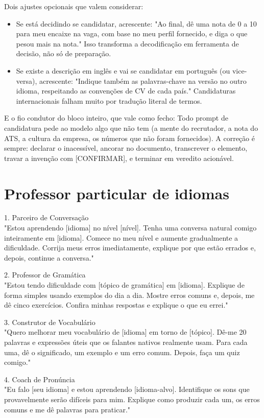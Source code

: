 \documentclass[11pt, a4paper]{article}
\begin{document}
Dois ajustes opcionais que valem considerar:
\begin{itemize}
	\item Se está decidindo se candidatar, acrescente: "Ao final, dê uma nota de 0 a 10 para meu encaixe na vaga, com base no meu perfil fornecido, e diga o que pesou mais na nota." Isso transforma a decodificação em ferramenta de decisão, não só de preparação.
	\item Se existe a descrição em inglês e vai se candidatar em português (ou vice-versa), acrescente: "Indique também as palavras-chave na versão no outro idioma, respeitando as convenções de CV de cada país." Candidaturas internacionais falham muito por tradução literal de termos.
\end{itemize}

E o fio condutor do bloco inteiro, que vale como fecho: Todo prompt de candidatura pede ao modelo algo que não tem (a mente do recrutador, a nota do ATS, a cultura da empresa, os números que não foram fornecidos). A correção é sempre: declarar o inacessível, ancorar no documento, transcrever o elemento, travar a invenção com [CONFIRMAR], e terminar em veredito acionável.

\section*{Professor particular de idiomas}
1. Parceiro de Conversação \\
"Estou aprendendo [idioma] no nível [nível]. Tenha uma conversa natural comigo inteiramente em [idioma]. Comece no meu nível e aumente gradualmente a dificuldade. Corrija meus erros imediatamente, explique por que estão errados e, depois, continue a conversa."

2. Professor de Gramática \\
"Estou tendo dificuldade com [tópico de gramática] em [idioma]. Explique de forma simples usando exemplos do dia a dia. Mostre erros comuns e, depois, me dê cinco exercícios. Confira minhas respostas e explique o que eu errei."

3. Construtor de Vocabulário \\
"Quero melhorar meu vocabulário de [idioma] em torno de [tópico]. Dê-me 20 palavras e expressões úteis que os falantes nativos realmente usam. Para cada uma, dê o significado, um exemplo e um erro comum. Depois, faça um quiz comigo."

4. Coach de Pronúncia \\
"Eu falo [seu idioma] e estou aprendendo [idioma-alvo]. Identifique os sons que provavelmente serão difíceis para mim. Explique como produzir cada um, os erros comuns e me dê palavras para praticar."
\end{document}
